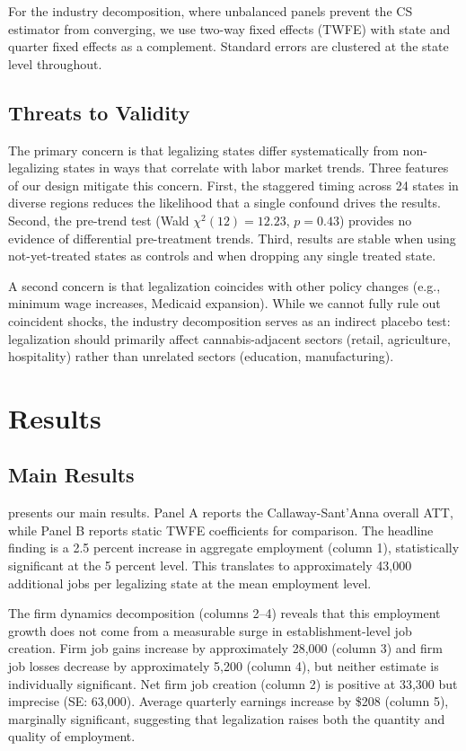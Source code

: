 \documentclass[12pt]{article}
\begin{document}
For the industry decomposition, where unbalanced panels prevent the CS estimator from converging, we use two-way fixed effects (TWFE) with state and quarter fixed effects as a complement. Standard errors are clustered at the state level throughout.

\subsection{Threats to Validity}

The primary concern is that legalizing states differ systematically from non-legalizing states in ways that correlate with labor market trends. Three features of our design mitigate this concern. First, the staggered timing across 24 states in diverse regions reduces the likelihood that a single confound drives the results. Second, the pre-trend test (Wald $\chi^2(12) = 12.23$, $p = 0.43$) provides no evidence of differential pre-treatment trends. Third, results are stable when using not-yet-treated states as controls and when dropping any single treated state.

A second concern is that legalization coincides with other policy changes (e.g., minimum wage increases, Medicaid expansion). While we cannot fully rule out coincident shocks, the industry decomposition serves as an indirect placebo test: legalization should primarily affect cannabis-adjacent sectors (retail, agriculture, hospitality) rather than unrelated sectors (education, manufacturing).

\section{Results}

\subsection{Main Results}



 presents our main results. Panel A reports the Callaway-Sant'Anna overall ATT, while Panel B reports static TWFE coefficients for comparison. The headline finding is a 2.5 percent increase in aggregate employment (column 1), statistically significant at the 5 percent level. This translates to approximately 43,000 additional jobs per legalizing state at the mean employment level.

The firm dynamics decomposition (columns 2--4) reveals that this employment growth does not come from a measurable surge in establishment-level job creation. Firm job gains increase by approximately 28,000 (column 3) and firm job losses decrease by approximately 5,200 (column 4), but neither estimate is individually significant. Net firm job creation (column 2) is positive at 33,300 but imprecise (SE: 63,000). Average quarterly earnings increase by \$208 (column 5), marginally significant, suggesting that legalization raises both the quantity and quality of employment.
\end{document}
